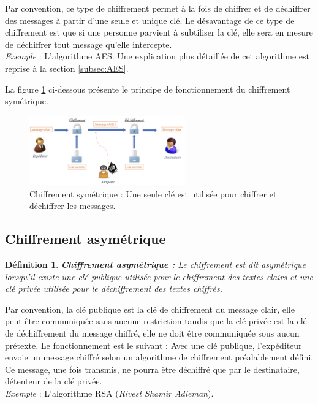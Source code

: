 \documentclass[oneside]{book}
\newtheorem{definition}{Définition}[section]
\begin{document}
\hspace{-0.5cm}Par convention, ce type de chiffrement permet à la fois de chiffrer et de déchiffrer des messages à partir d'une seule et unique clé. Le désavantage de ce type de chiffrement est que si une personne parvient à subtiliser la clé, elle sera en mesure de déchiffrer tout message qu'elle intercepte.  \\
\textit{Exemple} : L'algorithme AES. Une explication plus détaillée de cet algorithme est reprise à la section \ref{subsec:AES}.


\hspace{-0.5cm}La figure \ref{fig:symétrique} ci-dessous présente le principe de fonctionnement du chiffrement symétrique.

\begin{figure}[htbp]
    \centering
    \includegraphics[width=0.6\textwidth]{image/symetrique}
    \caption{Chiffrement symétrique : Une seule clé est utilisée pour chiffrer et déchiffrer les messages.}
    \label{fig:symétrique}
\end{figure}


\subsection{Chiffrement asymétrique}
\label{subsec:Chiffrement_asymétrique}

\theoremstyle{definition}
\begin{definition}{\textbf{Chiffrement asymétrique :}}
Le chiffrement est dit asymétrique lorsqu'il existe une clé publique utilisée pour le chiffrement des textes clairs et une clé privée utilisée pour le déchiffrement des textes chiffrés. 
\end{definition}

\hspace{-0.5cm}Par convention, la clé publique est la clé de chiffrement du message clair, elle peut être communiquée sans aucune restriction tandis que la clé privée est la clé de déchiffrement du message chiffré, elle ne doit être communiquée sous aucun prétexte. Le fonctionnement est le suivant : Avec une clé publique, l'expéditeur envoie un message chiffré selon un algorithme de chiffrement préalablement défini. Ce message, une fois transmis, ne pourra être déchiffré que par le destinataire, détenteur de la clé privée. \\
\textit{Exemple} : L'algorithme RSA (\textit{Rivest Shamir Adleman}).
\end{document}
